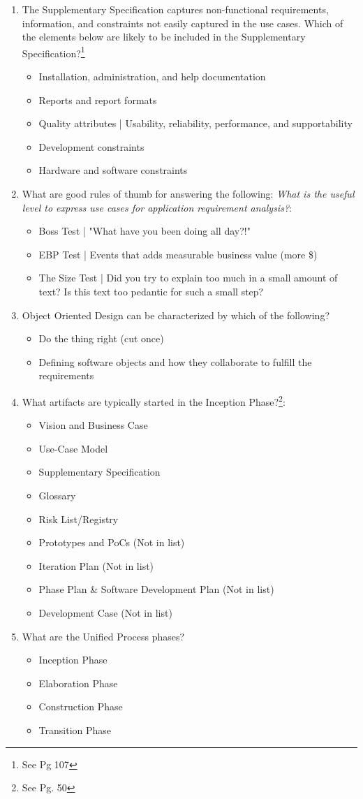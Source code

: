 \documentclass{article}
\begin{document}
\begin{enumerate}
\item The Supplementary Specification captures non-functional requirements, information, and constraints not easily captured in the use cases. Which of the elements below are likely to be included in the Supplementary Specification?\footnote{See Pg 107}
\begin{itemize}
\item Installation, administration, and help documentation
\item Reports and report formats
\item Quality attributes | Usability, reliability, performance, and supportability
\item Development constraints
\item Hardware and software constraints 
\end{itemize}
\item What are good rules of thumb for answering the following: \emph{What is the useful level to express use cases for application requirement analysis?}:
\begin{itemize}
\item Boss Test | "What have you been doing all day?!"
\item EBP Test | Events that adds measurable business value (more \$)
\item The Size Test | Did you try to explain too much in a small amount of text? Is this text too pedantic for such a small step?
\end{itemize}

\item Object Oriented Design can be characterized by which of the following?
\begin{itemize}
\item Do the thing right (cut once)
\item Defining software objects and how they collaborate to fulfill the requirements
\end{itemize}

\item What artifacts are typically started in the Inception Phase?\footnote{See Pg. 50}:
\begin{itemize}
\item Vision and Business Case
\item Use-Case Model
\item Supplementary Specification
\item Glossary
\item Risk List/Registry
\item Prototypes and PoCs (Not in list)
\item Iteration Plan (Not in list)
\item Phase Plan \& Software Development Plan (Not in list)
\item Development Case (Not in list)
\end{itemize}

\item What are the Unified Process phases?
\begin{itemize}
\item Inception Phase
\item Elaboration Phase
\item Construction Phase
\item Transition Phase
\end{itemize}
\end{enumerate}
\end{document}
